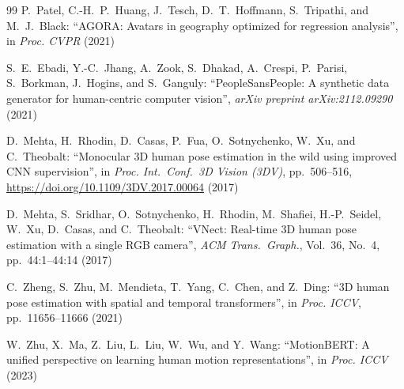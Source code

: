 \documentclass[english,fleqn]{ieej-e}
\begin{document}
\begin{thebibliography}{99}
P.~Patel, C.-H.~P.~Huang, J.~Tesch, D.~T.~Hoffmann, S.~Tripathi,
and M.~J.~Black: ``AGORA: Avatars in geography optimized for regression
analysis'', in \textit{Proc. CVPR} (2021)

S.~E.~Ebadi, Y.-C.~Jhang, A.~Zook, S.~Dhakad, A.~Crespi, P.~Parisi,
S.~Borkman, J.~Hogins, and S.~Ganguly:
``PeopleSansPeople: A synthetic data generator for human-centric computer
vision'', \textit{arXiv preprint arXiv:2112.09290} (2021)

D.~Mehta, H.~Rhodin, D.~Casas, P.~Fua, O.~Sotnychenko, W.~Xu,
and C.~Theobalt: ``Monocular 3D human pose estimation in the wild using
improved CNN supervision'', in \textit{Proc. Int.\ Conf.\ 3D Vision (3DV)},
pp.~506--516, \url{https://doi.org/10.1109/3DV.2017.00064} (2017)

D.~Mehta, S.~Sridhar, O.~Sotnychenko, H.~Rhodin, M.~Shafiei,
H.-P.~Seidel, W.~Xu, D.~Casas, and C.~Theobalt:
``VNect: Real-time 3D human pose estimation with a single RGB camera'',
\textit{ACM Trans.\ Graph.}, Vol.~36, No.~4, pp.~44:1--44:14 (2017)

C.~Zheng, S.~Zhu, M.~Mendieta, T.~Yang, C.~Chen, and Z.~Ding:
``3D human pose estimation with spatial and temporal transformers'',
in \textit{Proc. ICCV}, pp.~11656--11666 (2021)

W.~Zhu, X.~Ma, Z.~Liu, L.~Liu, W.~Wu, and Y.~Wang:
``MotionBERT: A unified perspective on learning human motion
representations'', in \textit{Proc. ICCV} (2023)

\end{thebibliography}
\end{document}
